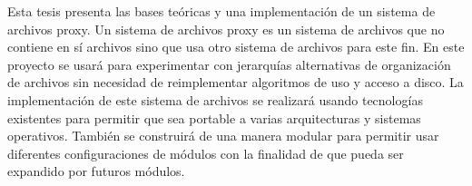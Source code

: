 


\begin{summary}        %

Esta tesis presenta las bases teóricas y una implementación de un sistema de archivos proxy. Un sistema de archivos proxy es un sistema de archivos que no contiene en sí archivos sino que usa otro sistema de archivos para este fin. En este proyecto se usará para experimentar con jerarquías alternativas de organización de archivos sin necesidad de reimplementar algoritmos de uso y acceso a disco. La implementación de este sistema de archivos se realizará usando tecnologías existentes para permitir que sea portable a varias arquitecturas y sistemas operativos. También se construirá de una manera modular para permitir usar diferentes configuraciones de módulos con la finalidad de que pueda ser expandido por futuros módulos.

\end{summary}




